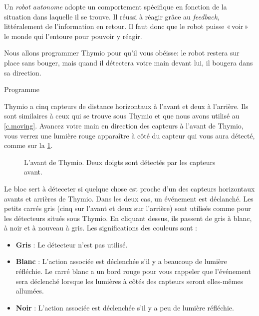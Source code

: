 \label{ch.pet}

Un \emph{robot autonome} adopte un comportement spécifique en fonction de la situation dans laquelle il se trouve.
Il réussi à réagir grâce au \textit{feedback}, littéralement de l'information en retour.
Il faut donc que le robot puisse «\,voir\,» le monde qui l'entoure pour pouvoir y réagir.


Nous allons programmer Thymio pour qu'il vous obéisse:
le robot restera sur place sans bouger, mais quand il détectera votre main devant lui, il bougera dans sa direction.

{\raggedleft \hfill Programme }

Thymio a cinq capteurs de distance horizontaux à l'avant et deux à l'arrière.
Ils sont similaires à ceux qui se trouve sous Thymio et que nous avons utilisé au \cref{c.moving}.
Avancez votre main en direction des capteurs à l'avant de Thymio, vous verrez une lumière rouge apparaître à côté du capteur qui vous aura détecté, comme sur la \cref{fig.detect}.

\begin{figure}
\begin{center}
\caption{L'avant de Thymio. Deux doigts sont détectés par les capteurs avant.}\label{fig.detect}
\end{center}
\end{figure}

Le bloc  sert à déteceter si quelque chose est proche d'un des capteurs horizontaux avants et arrières de Thymio.
Dans les deux cas, un événement est déclanché.
Les petits carrés gris (cinq sur l'avant et deux sur l'arrière) sont utilisés comme pour les détecteurs situés sous Thymio.
En cliquant dessus, ils passent de gris à blanc, à noir et à nouveau à gris.
Les significations des couleurs sont :

\begin{itemize}
\item \textbf{Gris} : Le détecteur n'est pas utilisé.
\item \textbf{Blanc} : L'action associée est déclenchée s'il y a beaucoup de lumière réfléchie.
Le carré blanc a un bord rouge pour vous rappeler que l'événement sera déclenché lorsque les lumières à côtés des capteurs seront elles-mêmes allumées.
\item \textbf{Noir} : L'action associée est déclenchée s'il y a peu de lumière réfléchie.
\end{itemize}

